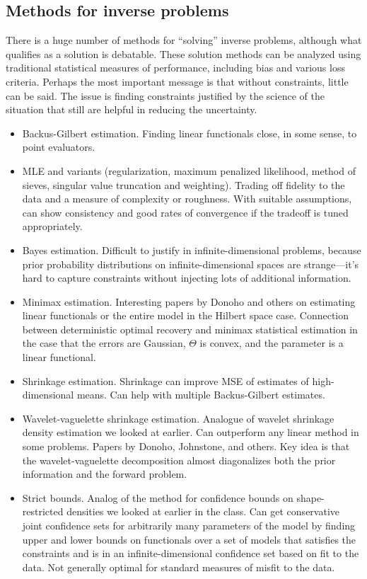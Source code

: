 \subsection{Methods for inverse problems}
There is a huge number of methods for ``solving'' inverse problems, although
what qualifies as a solution is debatable.
These solution methods can be analyzed using traditional statistical measures
of performance, including bias and various loss criteria.
Perhaps the most important message is that without constraints, little
can be said.  The issue is finding constraints justified by the science
of the situation that still are helpful in reducing the uncertainty.
\begin{itemize}
    \item Backus-Gilbert estimation.  Finding linear functionals close, in some sense,
    to point evaluators.
    \item MLE and variants (regularization, maximum penalized likelihood, method of sieves,
        singular value truncation and weighting).
        Trading off fidelity to the data and a measure of complexity or roughness.
        With suitable assumptions, can show consistency and good rates of convergence
        if the tradeoff is tuned appropriately.
    \item Bayes estimation.  Difficult to justify in infinite-dimensional problems,
    because prior probability distributions on infinite-dimensional spaces are
    strange---it's hard to capture constraints without injecting lots of additional
    information.
    \item Minimax estimation.  Interesting papers by Donoho and others on estimating
    linear functionals or the entire model in the Hilbert space case.
    Connection between deterministic optimal recovery and minimax statistical
    estimation in the case that the errors are Gaussian, $\Theta$ is convex,
    and the parameter is a linear functional.
    \item Shrinkage estimation.  Shrinkage can improve MSE of estimates of
    high-dimensional means.  Can help with multiple Backus-Gilbert estimates.
    \item Wavelet-vaguelette shrinkage estimation. Analogue of wavelet shrinkage
    density estimation we looked at earlier.  Can outperform any linear method
    in some problems.  Papers by Donoho, Johnstone, and others.  Key idea is that
    the wavelet-vaguelette decomposition almost diagonalizes both the prior information
    and the forward problem.
    \item Strict bounds.  Analog of the method for confidence bounds on shape-restricted
    densities we looked at earlier in the class. Can get conservative joint confidence
    sets for arbitrarily many parameters of the model by finding upper and lower bounds
    on functionals over a set of models that satisfies the constraints and is in an
    infinite-dimensional confidence set based on fit to the data. Not generally
    optimal for standard measures of misfit to the data.
\end{itemize}




